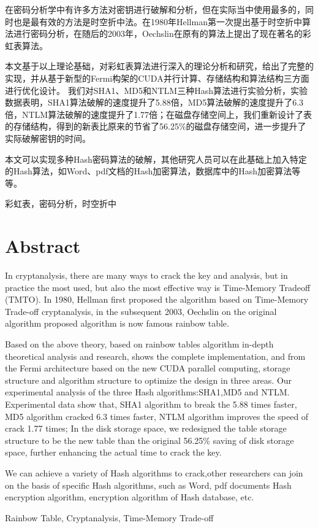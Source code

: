 {}
在密码分析学中有许多方法对密钥进行破解和分析，但在实际当中使用最多的，同时也是最有效的方法是时空折中法。在1980年Hellman第一次提出基于时空折中算法进行密码分析，在随后的2003年，Oechslin在原有的算法上提出了现在著名的彩虹表算法。

本文基于以上理论基础，对彩虹表算法进行深入的理论分析和研究，给出了完整的实现，并从基于新型的Fermi构架的CUDA并行计算、存储结构和算法结构三方面进行优化设计。
我们对SHA1、MD5和NTLM三种Hash算法进行实验分析，实验数据表明，SHA1算法破解的速度提升了5.88倍，MD5算法破解的速度提升了6.3倍，NTLM算法破解的速度提升了1.77倍；在磁盘存储空间上，我们重新设计了表的存储结构，得到的新表比原来的节省了56.25\%的磁盘存储空间，进一步提升了实际破解密钥的时间。

本文可以实现多种Hash密码算法的破解，其他研究人员可以在此基础上加入特定的Hash算法，如Word、pdf文档的Hash加密算法，数据库中的Hash加密算法等等。

\vskip 5cm
彩虹表，密码分析，时空折中\\
\setcounter{page}{3}

\chapter* {Abstract}
In cryptanalysis, there are many ways to crack the key and analysis, but in practice the most used, but also the most effective way is Time-Memory Tradeoff (TMTO).
In 1980, Hellman first proposed the algorithm based on Time-Memory Trade-off cryptanalysis, in the subsequent 2003, Oechslin on the original algorithm proposed algorithm is now famous rainbow table.

Based on the above theory, based on rainbow tables algorithm in-depth theoretical analysis and research, shows the complete implementation, and from the Fermi architecture based on the new CUDA parallel computing, storage structure and algorithm structure to optimize the design in three areas.
Our experimental analysis of the three Hash algorithms:SHA1,MD5 and NTLM.
Experimental data show that, SHA1 algorithm to break the 5.88 times faster, MD5 algorithm cracked 6.3 times faster, NTLM algorithm improves the speed of crack 1.77 times;
In the disk storage space, we redesigned the table storage structure to be the new table than the original 56.25\% saving of disk storage space, further enhancing the actual time to crack the key.

We can achieve a variety of Hash algorithms to crack,other researchers can join on the basis of specific Hash algorithms, such as Word, pdf documents Hash encryption algorithm, encryption algorithm of Hash database, etc.

\vskip 5cm
Rainbow Table, Cryptanalysis, Time-Memory Trade-off\\
\setcounter{page}{5}


